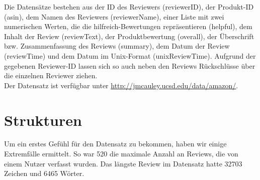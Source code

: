 \documentclass{scrartcl}
\theoremstyle{my_th_style}
\begin{document}
Die Datensätze bestehen aus der ID des Reviewers (reviewerID), der Produkt-ID (asin), dem Namen des Reviewers (reviewerName), einer Liste mit zwei numerischen Werten, die die hilfreich-Bewertungen repräsentieren (helpful), dem Inhalt der Review (reviewText), der Produktbewertung (overall), der Überschrift bzw. Zusammenfassung des Reviews (summary), dem Datum der Review (reviewTime) und dem Datum im Unix-Format (unixReviewTime). Aufgrund der gegebenen Reviewer-ID lassen sich so auch neben den Reviews Rückschlüsse über die einzelnen Reviewer ziehen.\\
Der Datensatz ist verfügbar unter \url{http://jmcauley.ucsd.edu/data/amazon/}.
\section{Strukturen}
Um ein erstes Gefühl für den Datensatz zu bekommen, haben wir einige Extremfälle ermittelt. So war 520 die maximale Anzahl an Reviews, die von einem Nutzer verfasst wurden. Das längste Review im Datensatz hatte 32703 Zeichen und 6465 Wörter.
\end{document}
